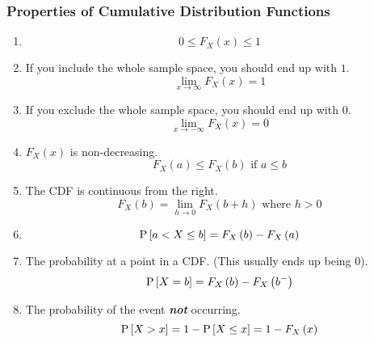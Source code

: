 		\subsubsection{Properties of Cumulative Distribution Functions} \label{subsubsec:Properties of Cumulative Distribution Functions}
			\begin{enumerate}[label=\textbf{(\roman*)}, noitemsep, nolistsep]
				\item 
					\begin{equation}
						0 \leq F_{X} \left( x \right) \leq 1
					\end{equation}
				\item If you include the whole sample space, you should end up with $1$.
					\begin{equation}
						\lim\limits_{x \rightarrow \infty} F_{X} \left( x \right) = 1
					\end{equation}
				\item If you exclude the whole sample space, you should end up with $0$.
					\begin{equation}
						\lim\limits_{x \rightarrow -\infty} F_{X} \left( x \right) = 0
					\end{equation}
				\item $F_{X} \left( x \right)$ is non-decreasing.
					\begin{equation}
						F_{X} \left( a \right) \leq F_{X} \left( b \right) \text{ if } a \leq b
					\end{equation}
				\item The CDF is continuous from the right.
					\begin{equation}
				 		F_{X} \left( b \right) = \lim\limits_{h \rightarrow 0} F_{X} \left( b+h \right) \text{ where } h>0
					\end{equation}
				\item
					\begin{equation}
						\operatorname{\operatorname{P}} \left[ a<X \leq b \right] = F_{X} \left( b \right) - F_{X} \left( a \right)
					\end{equation}
				\item The probability at a point in a CDF. (This usually ends up being $0$).
					\begin{equation}
						\operatorname{\operatorname{P}} \left[ X=b \right] = F_{X} \left( b \right) - F_{X} \left( b^{-} \right)
					\end{equation}
				\item The probability of the event \emph{\textbf{not}} occurring.
					\begin{equation}
						\operatorname{\operatorname{P}} \left[ X>x \right] = 1 - \operatorname{\operatorname{P}} \left[ X \leq x \right] =  1 - F_{X} \left( x \right)
					\end{equation}
			\end{enumerate}
		
